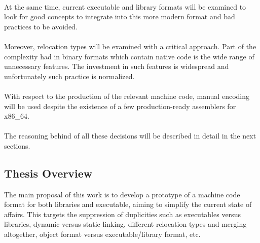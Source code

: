 \documentclass[12pt]{article}
\begin{document}
    \paragraph{}At the same time, current executable and library formats will be examined to look for good concepts to integrate into this more modern format and bad practices to be avoided.
    
    \paragraph{}Moreover, relocation types will be examined with a critical approach. Part of the complexity had in binary formats which contain native code is the wide range of unnecessary features. The investment in such features is widespread and unfortunately such practice is normalized.
    
    \paragraph{} With respect to the production of the relevant machine code, manual encoding will be used despite the existence of a few production-ready assemblers for x86\_64. 
    
    \paragraph{} The reasoning behind of all these decisions will be described in detail in the next sections.


	\subsection{Thesis Overview}
	The main proposal of this work is to develop a prototype of a machine code format for both libraries and executable, aiming to simplify the current state of affairs. This targets the suppression of duplicities such as executables versus libraries, dynamic versus static linking, different relocation types and merging altogether, object format versus executable/library format, etc.
	
\end{document}
